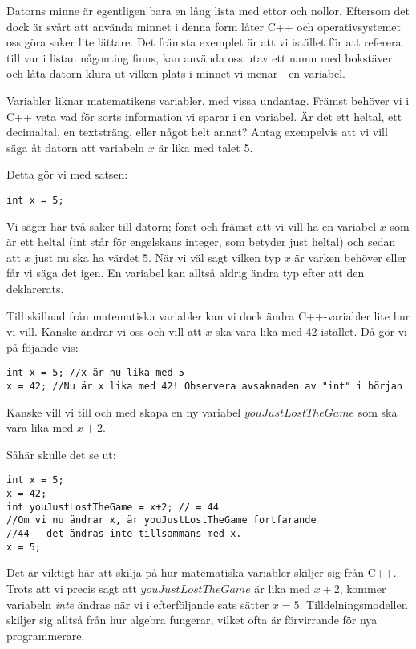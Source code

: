 Datorns minne är egentligen bara en lång lista med ettor och nollor. Eftersom det dock är svårt att använda minnet i denna form låter C++ och operativsystemet oss göra saker lite lättare. Det främsta exemplet är att vi istället för att referera till var i listan någonting finns, kan använda oss utav ett namn med bokstäver och låta datorn klura ut vilken plats i minnet vi menar - en variabel.

Variabler liknar matematikens variabler, med vissa undantag. Främst behöver vi i C++ veta vad för sorts information vi sparar i en variabel. Är det ett heltal, ett decimaltal, en textsträng, eller något helt annat? Antag exempelvis att vi vill säga åt datorn att variabeln $x$ är lika med talet 5.

Detta gör vi med satsen:
\begin{lstlisting}
int x = 5;
\end{lstlisting}

Vi säger här två saker till datorn; först och främst att vi vill ha en variabel $x$ som är ett heltal (int står för engelskans integer, som betyder just heltal) och sedan att $x$ just nu ska ha värdet 5. När vi väl sagt vilken typ $x$ är varken behöver eller får vi säga det igen. En variabel kan alltså aldrig ändra typ efter att den deklarerats.

Till skillnad från matematiska variabler kan vi dock ändra C++-variabler lite hur vi vill. Kanske ändrar vi oss och vill att $x$ ska vara lika med 42 istället. Då gör vi på föjande vis:

\begin{lstlisting}
int x = 5; //x är nu lika med 5
x = 42; //Nu är x lika med 42! Observera avsaknaden av "int" i början
\end{lstlisting}

Kanske vill vi till och med skapa en ny variabel $youJustLostTheGame$ som ska vara lika med $x+2$.

Såhär skulle det se ut:

\begin{lstlisting}
int x = 5;
x = 42;
int youJustLostTheGame = x+2; // = 44
//Om vi nu ändrar x, är youJustLostTheGame fortfarande
//44 - det ändras inte tillsammans med x.
x = 5;
\end{lstlisting}

Det är viktigt här att skilja på hur matematiska variabler skiljer sig från C++. Trots att vi precis sagt att $youJustLostTheGame$ är lika med $x+2$, kommer variabeln \emph{inte} ändras när vi i efterföljande sats sätter $x = 5$. Tilldelningsmodellen skiljer sig alltså från hur algebra fungerar, vilket ofta är förvirrande för nya programmerare.

